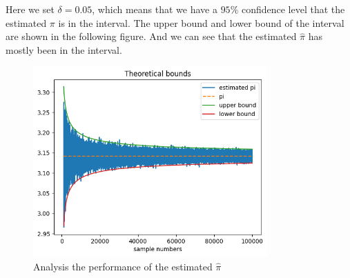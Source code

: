 \begin{homeworkProblem}
Here we set $\delta=0.05$, which means that we have a $95\%$ confidence level that the estimated $\pi$ is in the interval. The upper bound and lower bound of the interval are shown in the following figure. And we can see that the estimated $\hat{\pi}$ has mostly been in the interval.

\begin{figure}[h]
    \centering
    \includegraphics[width=0.8\textwidth]{./figure/p4/analysis.png}
    \caption{Analysis the performance of the estimated $\hat{\pi}$}
\end{figure}

\end{homeworkProblem}

\newpage